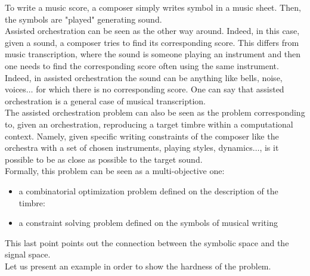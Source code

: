 \documentclass[a4paper]{book}
\begin{document}
To write a music score, a composer simply writes symbol in a music sheet. Then, the symbols are "played" generating sound. \\
Assisted orchestration can be seen as the other way around. Indeed, in this case, given a sound, a composer tries to find its corresponding score. This differs from music transcription, where the sound is someone playing an instrument and then one needs to find the corresponding score often using the same instrument. Indeed, in assisted orchestration the sound can be anything like bells, noise, voices$\ldots$ for which there is no corresponding score. One can say that assisted orchestration is a general case of musical transcription. \\

The assisted orchestration problem can also be seen as the problem corresponding to, given an orchestration, reproducing a target timbre within a computational context. Namely, given specific writing constraints of the composer like the orchestra with a set of chosen instruments, playing styles, dynamics$\ldots$, is it possible to be as close as possible to the target sound. \\

Formally, this problem can be seen as a multi-objective one:
\begin{itemize}
    \item a combinatorial optimization problem defined on the description of the timbre: 
    \item a constraint solving problem defined on the symbols of musical writing
\end{itemize}
This last point points out the connection between the symbolic space and the signal space.\\

Let us present an example in order to show the hardness of the problem.
\end{document}
